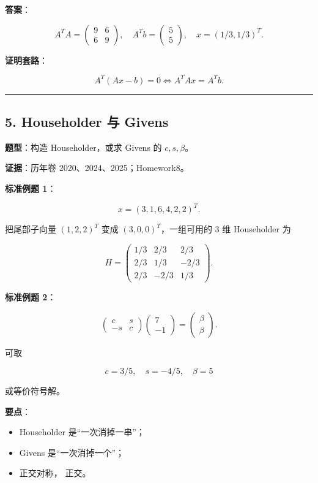 \documentclass[11pt,a4paper]{ctexart}
\newcommand{\code}[1]{\begingroup\ttfamily\small #1\endgroup}
\begin{document}
\textbf{答案}：

\[
A^TA=\begin{pmatrix}9&6\\6&9\end{pmatrix},\quad
A^Tb=\begin{pmatrix}5\\5\end{pmatrix},\quad
x=(1/3,1/3)^T.
\]

\textbf{证明套路}：

\[
A^T(Ax-b)=0 \iff A^TAx=A^Tb.
\]

\bigskip\hrule\bigskip


\subsection*{5. Householder 与 Givens}


\textbf{题型}：构造 Householder，或求 Givens 的 $c,s,\beta$。

\textbf{证据}：历年卷 2020、2024、2025；Homework8。

\textbf{标准例题 1}：

\[
x=(3,1,6,4,2,2)^T.
\]

把尾部子向量 $(1,2,2)^T$ 变成 $(3,0,0)^T$，一组可用的 3 维 Householder 为

\[
H=\begin{pmatrix}
1/3&2/3&2/3\\
2/3&1/3&-2/3\\
2/3&-2/3&1/3
\end{pmatrix}.
\]

\textbf{标准例题 2}：

\[
\begin{pmatrix}c&s\\-s&c\end{pmatrix}
\begin{pmatrix}7\\-1\end{pmatrix}
=\begin{pmatrix}\beta\\\beta\end{pmatrix}.
\]

可取

\[
c=3/5,\quad s=-4/5,\quad \beta=5
\]

或等价符号解。

\textbf{要点}：

\begin{itemize}

\item Householder 是“一次消掉一串”；

\item Givens 是“一次消掉一个”；

\item \code{} 正交对称，\code{} 正交。

\end{itemize}
\end{document}
